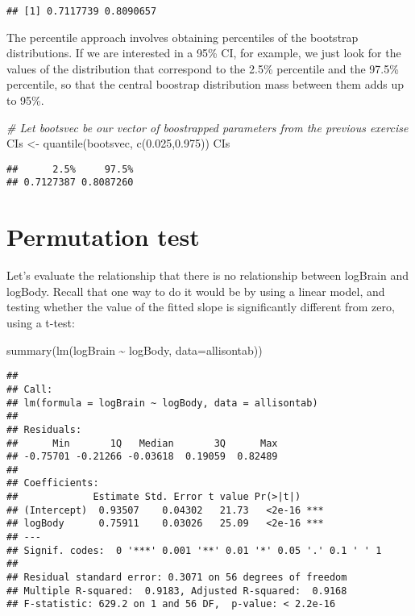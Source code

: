 \documentclass[
]{book}
\newenvironment{Shaded}{\begin{snugshade}}{\end{snugshade}}
\newcommand{\AttributeTok}[1]{\textcolor[rgb]{0.77,0.63,0.00}{#1}}
\newcommand{\CommentTok}[1]{\textcolor[rgb]{0.56,0.35,0.01}{\textit{#1}}}
\newcommand{\FloatTok}[1]{\textcolor[rgb]{0.00,0.00,0.81}{#1}}
\newcommand{\FunctionTok}[1]{\textcolor[rgb]{0.00,0.00,0.00}{#1}}
\newcommand{\NormalTok}[1]{#1}
\newcommand{\OtherTok}[1]{\textcolor[rgb]{0.56,0.35,0.01}{#1}}
\newcommand{\SpecialCharTok}[1]{\textcolor[rgb]{0.00,0.00,0.00}{#1}}
\begin{document}
\begin{verbatim}
## [1] 0.7117739 0.8090657
\end{verbatim}

The percentile approach involves obtaining percentiles of the bootstrap distributions. If we are interested in a 95\% CI, for example, we just look for the values of the distribution that correspond to the 2.5\% percentile and the 97.5\% percentile, so that the central boostrap distribution mass between them adds up to 95\%.

\begin{Shaded}
\begin{Highlighting}[]
\CommentTok{\# Let bootsvec be our vector of boostrapped parameters from the previous exercise}
\NormalTok{CIs }\OtherTok{\textless{}{-}} \FunctionTok{quantile}\NormalTok{(bootsvec, }\FunctionTok{c}\NormalTok{(}\FloatTok{0.025}\NormalTok{,}\FloatTok{0.975}\NormalTok{))}
\NormalTok{CIs}
\end{Highlighting}
\end{Shaded}

\begin{verbatim}
##      2.5%     97.5% 
## 0.7127387 0.8087260
\end{verbatim}

\hypertarget{permutation-test}{%
\section{Permutation test}\label{permutation-test}}

Let's evaluate the relationship that there is no relationship between logBrain and logBody. Recall that one way to do it would be by using a linear model, and testing whether the value of the fitted slope is significantly different from zero, using a t-test:

\begin{Shaded}
\begin{Highlighting}[]
\FunctionTok{summary}\NormalTok{(}\FunctionTok{lm}\NormalTok{(logBrain }\SpecialCharTok{\textasciitilde{}}\NormalTok{ logBody, }\AttributeTok{data=}\NormalTok{allisontab))}
\end{Highlighting}
\end{Shaded}

\begin{verbatim}
## 
## Call:
## lm(formula = logBrain ~ logBody, data = allisontab)
## 
## Residuals:
##      Min       1Q   Median       3Q      Max 
## -0.75701 -0.21266 -0.03618  0.19059  0.82489 
## 
## Coefficients:
##             Estimate Std. Error t value Pr(>|t|)    
## (Intercept)  0.93507    0.04302   21.73   <2e-16 ***
## logBody      0.75911    0.03026   25.09   <2e-16 ***
## ---
## Signif. codes:  0 '***' 0.001 '**' 0.01 '*' 0.05 '.' 0.1 ' ' 1
## 
## Residual standard error: 0.3071 on 56 degrees of freedom
## Multiple R-squared:  0.9183, Adjusted R-squared:  0.9168 
## F-statistic: 629.2 on 1 and 56 DF,  p-value: < 2.2e-16
\end{verbatim}
\end{document}
